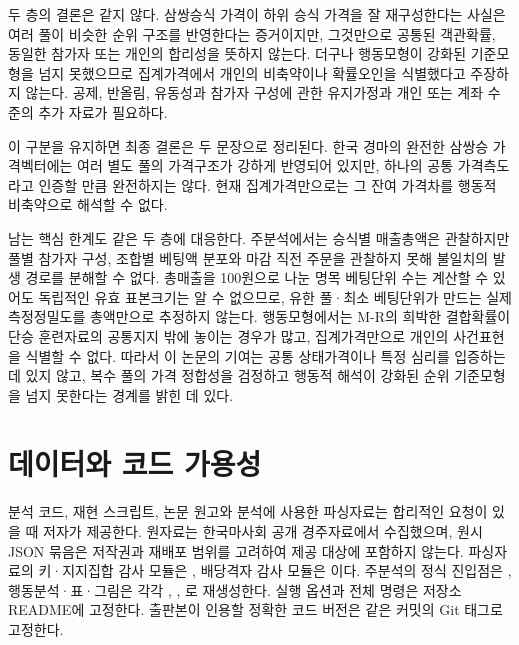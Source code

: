 두 층의 결론은 같지 않다. 삼쌍승식 가격이 하위 승식 가격을 잘 재구성한다는
사실은 여러 풀이 비슷한 순위 구조를 반영한다는 증거이지만, 그것만으로 공통된
객관확률, 동일한 참가자 또는 개인의 합리성을 뜻하지 않는다. 더구나 행동모형이
강화된 기준모형을 넘지 못했으므로 집계가격에서 개인의 비축약이나 확률오인을
식별했다고 주장하지 않는다. 공제, 반올림, 유동성과 참가자 구성에 관한
유지가정과 개인 또는 계좌 수준의 추가 자료가 필요하다.

이 구분을 유지하면 최종 결론은 두 문장으로 정리된다. 한국 경마의 완전한
삼쌍승 가격벡터에는 여러 별도 풀의 가격구조가 강하게 반영되어 있지만, 하나의
공통 가격측도라고 인증할 만큼 완전하지는 않다. 현재 집계가격만으로는 그 잔여
가격차를 행동적 비축약으로 해석할 수 없다.

남는 핵심 한계도 같은 두 층에 대응한다. 주분석에서는 승식별 매출총액은
관찰하지만 풀별 참가자 구성, 조합별 베팅액 분포와 마감 직전 주문을 관찰하지
못해 불일치의 발생 경로를 분해할 수 없다. 총매출을 100원으로 나눈 명목
베팅단위 수는 계산할 수 있어도 독립적인 유효 표본크기는 알 수 없으므로,
유한 풀·최소 베팅단위가 만드는 실제 측정정밀도를 총액만으로 추정하지 않는다.
행동모형에서는 M-R의 희박한 결합확률이 단승
훈련자료의 공통지지 밖에 놓이는 경우가 많고, 집계가격만으로 개인의 사건표현을
식별할 수 없다. 따라서 이 논문의 기여는 공통 상태가격이나 특정 심리를
입증하는 데 있지 않고, 복수 풀의 가격 정합성을 검정하고 행동적 해석이 강화된
순위 기준모형을 넘지 못한다는 경계를 밝힌 데 있다.

\section*{데이터와 코드 가용성}

분석 코드, 재현 스크립트, 논문 원고와 분석에 사용한 파싱자료는 합리적인 요청이
있을 때 저자가 제공한다. 원자료는 한국마사회 공개 경주자료에서 수집했으며,
원시 JSON 묶음은 저작권과 재배포 범위를 고려하여 제공 대상에 포함하지 않는다. 파싱자료의
키·지지집합 감사 모듈은 , 배당격자 감사 모듈은
이다. 주분석의 정식 진입점은
, 행동분석·표·그림은 각각
, ,
로 재생성한다. 실행 옵션과 전체 명령은
저장소 README에 고정한다. 출판본이 인용할 정확한 코드 버전은 같은 커밋의
Git 태그로 고정한다.
